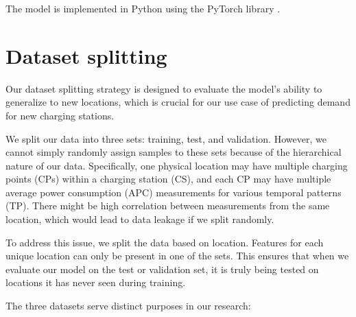 The model is implemented in Python using the PyTorch library
.

\newpage


\section{Dataset splitting}
\label{sec:dataset-split}

Our dataset splitting strategy is designed to evaluate the model's ability to generalize to new locations, which is crucial for our use case of predicting demand for new charging stations.

We split our data into three sets: training, test, and validation. However, we cannot simply randomly assign samples to these sets because of the hierarchical nature of our data. Specifically, one physical location may have multiple charging points (CPs) within a charging station (CS), and each CP may have multiple average power consumption (APC) measurements for various temporal patterns (TP). There might be high correlation between measurements from the same location, which would lead to data leakage if we split randomly.

To address this issue, we split the data based on location. Features for each unique location can only be present in one of the sets. This ensures that when we evaluate our model on the test or validation set, it is truly being tested on locations it has never seen during training.


The three datasets serve distinct purposes in our research:

